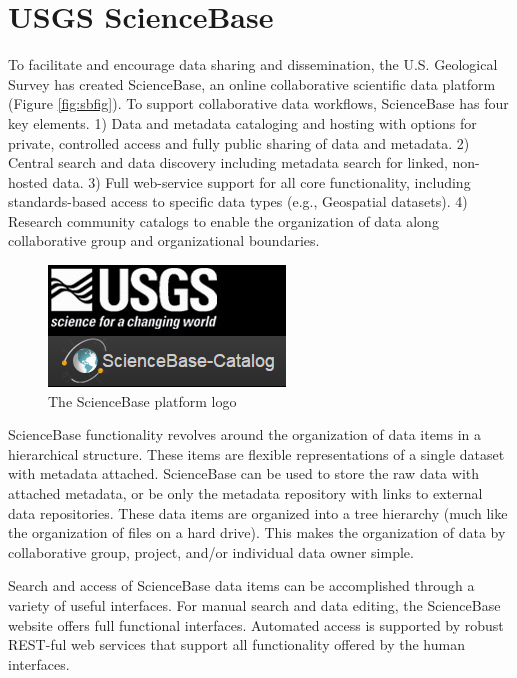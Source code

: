 \section{USGS ScienceBase}

To facilitate and encourage data sharing and dissemination, 
the U.S. Geological Survey has created ScienceBase, an online 
collaborative scientific data platform (Figure \ref{fig:sbfig}). To support collaborative 
data workflows, ScienceBase has four key elements. 1) Data and metadata
cataloging and hosting with options for private, controlled access 
and fully public sharing of data and metadata. 2) Central search and
data discovery including metadata search for linked, non-hosted data. 
3) Full web-service support for all core functionality, including 
standards-based access to specific data types (e.g., Geospatial 
datasets). 4) Research community catalogs to 
enable the organization of data along collaborative group and 
organizational boundaries. 

 \begin{figure}[htbp]
   \centering
   \includegraphics{sblogo}
   \caption{The ScienceBase platform logo}
   \label{figure:sbfig}
 \end{figure}

ScienceBase functionality revolves around the organization of data 
items in a hierarchical structure. These items are flexible representations
of a single dataset with metadata attached. ScienceBase can be used to
store the raw data with attached metadata, or be only the metadata 
repository with links to external data repositories. These data items
are organized into a tree hierarchy (much like the organization of files
on a hard drive). This makes the organization of data by collaborative 
group, project, and/or individual data owner simple. 

Search and access of ScienceBase data items can be accomplished through
a variety of useful interfaces. For manual search and data editing, 
the ScienceBase website offers full functional interfaces. Automated
access is supported by robust REST-ful web services that support all 
functionality offered by the human interfaces. 

